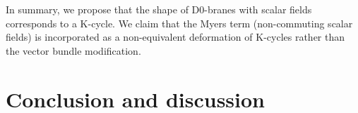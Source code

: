 \documentclass[12pt]{article}
\numberwithin{equation}{section}
\def\real{\mathbb{R}}
\begin{document}
In summary, we propose that the shape of D0-branes with scalar fields 
corresponds to a K-cycle.
We claim that the Myers term (non-commuting scalar fields) is incorporated as a non-equivalent deformation of K-cycles rather than the vector bundle modification.


\section{Conclusion and discussion}
\label{sec:comments}

%
\end{document}
